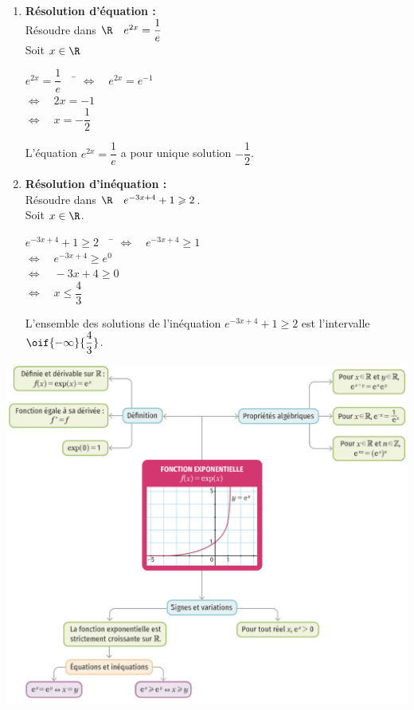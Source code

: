 \documentclass[a4paper,11pt,cours]{nsi} %
\begin{document}
\begin{exemple}[s]
	\begin{multicols}{2}
		\begin{enumerate}[label=\textbullet]
			\item 	\textbf{Résolution d'équation :}\\
			Résoudre dans $\R \quad e^{2x}=\dfrac{1}{e}$ \\
			Soit $x\in\R$
			\begin{tabbing}
				$e^{2x}=\dfrac{1}{e} \quad$		\=	$\Leftrightarrow\quad e^{2x}=e^{-1}$\\
				
				\>	$\Leftrightarrow\quad 2x=-1$\\
				\>	$\Leftrightarrow \quad x=-\dfrac{1}{2}$
			\end{tabbing}
			L'équation $e^{2x}=\dfrac{1}{e}$ a pour unique solution $-\dfrac{1}{2}$.
			\vspace{0.8cm}
			\item	\textbf{Résolution d'inéquation :}\\
			Résoudre dans $\R \quad e^{-3x+4}+1\geqslant2$.\\
			Soit $x\in\R$.
			\begin{tabbing}
				$e^{-3x+4}+1\geqslant2 \quad$		\=	$\Leftrightarrow\quad e^{-3x+4}\geqslant1$\\
				
				\>	$\Leftrightarrow\quad  e^{-3x+4}\geqslant e^{0}$\\
				
				\> $\Leftrightarrow\quad -3x+4\geqslant 0$\\
				
				\> $\Leftrightarrow\quad x\leqslant\dfrac{4}{3}$
			\end{tabbing}
			L'ensemble des solutions de l'inéquation $e^{-3x+4}+1\geqslant2$ est l'intervalle $\oif{-\infty}{\dfrac{4}{3}}$.
		\end{enumerate}
	\end{multicols}
	
	
\end{exemple}
\newpage
\begin{aretenir}
\includegraphics[width=16.5cm]{cartementale}
\end{aretenir}
\end{document}

